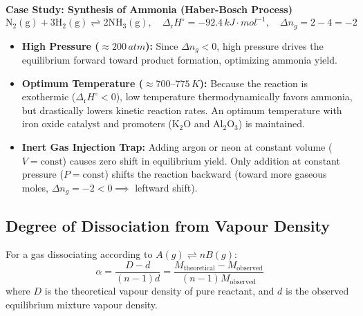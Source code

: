 \documentclass[10pt,twoside,openright]{book}
\begin{document}
\begin{ncertbox}
\textbf{Case Study: Synthesis of Ammonia (Haber-Bosch Process)}
\begin{equation*}
  \mathrm{N_2(g) + 3H_2(g) \rightleftharpoons 2NH_3(g)}, \quad \Delta_{\mathrm{r}}H^\circ = -92.4\,\si{kJ\cdot mol^{-1}}, \quad \Delta n_g = 2 - 4 = -2
\end{equation*}
\begin{itemize}
  \item \textbf{High Pressure ($\approx 200\,\si{atm}$):} Since $\Delta n_g < 0$, high pressure drives the equilibrium forward toward product formation, optimizing ammonia yield.
  \item \textbf{Optimum Temperature ($\approx 700\text{--}775\,\si{K}$):} Because the reaction is exothermic ($\Delta_{\mathrm{r}}H^\circ < 0$), low temperature thermodynamically favors ammonia, but drastically lowers kinetic reaction rates. An optimum temperature with iron oxide catalyst and promoters ($\mathrm{K_2O}$ and $\mathrm{Al_2O_3}$) is maintained.
  \item \textbf{Inert Gas Injection Trap:} Adding argon or neon at constant volume ($V = \text{const}$) causes zero shift in equilibrium yield. Only addition at constant pressure ($P = \text{const}$) shifts the reaction backward (toward more gaseous moles, $\Delta n_g = -2 < 0 \implies$ leftward shift).
\end{itemize}
\end{ncertbox}

\subsection{Degree of Dissociation from Vapour Density}
For a gas dissociating according to $A(g) \rightleftharpoons n B(g)$:
\begin{equation}
  \alpha = \frac{D - d}{(n - 1)d} = \frac{M_{\text{theoretical}} - M_{\text{observed}}}{(n - 1)M_{\text{observed}}}
\end{equation}
where $D$ is the theoretical vapour density of pure reactant, and $d$ is the observed equilibrium mixture vapour density.
\end{document}
